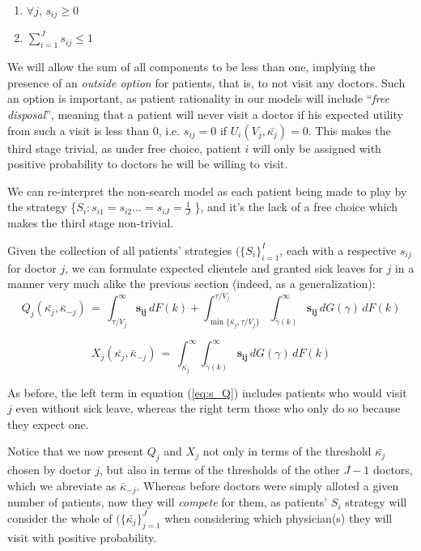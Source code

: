 \documentclass{article}
\begin{document}
\begin{enumerate}[label=\roman*.]
    \item $\forall j, \, s_{ij} \geq 0$
    \item $\sum_{i = 1}^{J} s_{ij} \leq 1$
\end{enumerate}

We will allow the sum of all components to be less than one, implying the presence of an \textit{outside option} for patients, that is, to not visit any doctors. Such an option is important, as patient rationality in our models will include  ``\textit{free disposal}'', meaning that a patient will never visit a doctor if his expected utility from such a visit is less than $0$, i.e. $s_{ij} = 0$ if $U_i(V_j,\bar{\kappa_j}) = 0$. This makes the third stage trivial, as under free choice, patient $i$ will only be assigned with positive probability to doctors he will be willing to visit.

We can re-interpret the non-search model as each patient being made to play by the strategy \{$S_i: s_{i1} = s_{i2} ... = s_{iJ} = \frac{1}{J}$ \}, and it's the lack of a free choice which makes the third stage non-trivial.

Given the collection of all patients' strategies $(\{S_i\}_{i =1}^{I}$, each with a respective $s_{ij}$ for doctor $j$, we can formulate expected clientele and granted sick leaves for $j$ in a manner very much alike the previous section (indeed, as a generalization):
\begin{equation}
    Q_j(\bar{\kappa_j}, \bar{\kappa}_{-j}) \,=\, \int_{\tau/V_j}^{\infty}\bm{s_{ij}}\,dF(k) +  \int_{\min\{\bar{\kappa_j},\tau/V_j\}}^{\tau/V_j} \int_{\tilde{\gamma}(k)}^{\infty}\bm{s_{ij}} \,dG(\gamma) \,dF(k)  \tag{S.1}\label{eq:s_Q}
\end{equation}

\begin{equation}
    X_j(\bar{\kappa_j}, \bar{\kappa}_{-j}) \,=\, \int_{\bar{\kappa_j}}^{\infty} \int_{\tilde{\gamma}(k)}^{\infty}\bm{s_{ij}} \,dG(\gamma) \,dF(k)
    \tag{S.2}\label{eq:s_X}
\end{equation}

As before, the left term in equation (\ref{eq:s_Q}) includes patients who would visit $j$ even without sick leave, whereas the right term those who only do so because they expect one.

Notice that we now present $Q_j$ and $X_j$  not only in terms of the threshold $\bar{\kappa_j}$ chosen by doctor $j$, but also in terms of the thresholds of the other $J - 1$ doctors, which we abreviate as $\bar{\kappa}_{-j}$. Whereas before doctors were simply alloted a given number of patients, now they will \textit{compete} for them, as patients' $S_i$ strategy will consider the whole of $(\{\bar{\kappa_j}\}_{j =1}^{J}$ when considering which physician(s) they will visit with positive probability.
\end{document}
